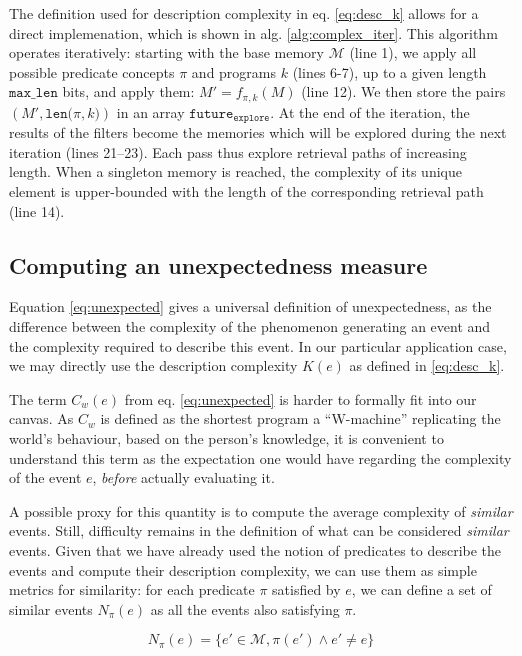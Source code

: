 \documentclass[conference]{IEEEtran}
\begin{document}
The definition used for description complexity in eq. \ref{eq:desc_k} allows for
a direct implemenation, which is shown in alg. \ref{alg:complex_iter}. This
algorithm operates iteratively: starting with the base memory $\mathcal{M}$
(line 1), we apply all possible predicate concepts $\pi$ and programs $k$ (lines
6-7), up to a given length $\mathtt{max\_len}$ bits, and apply them:
$M' = f_{\pi, k}(M)$ (line 12). We then store the pairs
$(M', \mathtt{len(}\pi, k\mathtt{)})$ in an array $\mathtt{future_{explore}}$. At
the end of the iteration, the results of the filters become the memories which
will be explored during the next iteration (lines 21--23). Each pass thus explore
retrieval paths of increasing length. When a singleton memory is reached, the
complexity of its unique element is upper-bounded with the length of the
corresponding retrieval path (line 14).


\subsection{Computing an unexpectedness measure}
Equation \ref{eq:unexpected} gives a universal definition of unexpectedness, as
the difference between the complexity of the phenomenon generating an event and
the complexity required to describe this event. In our particular application
case, we may directly use the description complexity $K(e)$ as defined in
\ref{eq:desc_k}.

The term $C_{w}(e)$ from eq. \ref{eq:unexpected} is harder to formally
fit into our canvas. As $C_{w}$ is defined as the shortest program a
``W-machine'' replicating the world's behaviour, based on the person's
knowledge\cite{dessalles2011coincidences}, it is convenient to understand this
term as the expectation one would have regarding the complexity of the event
$e$, \emph{before} actually evaluating it.

A possible proxy for this quantity is to compute the average complexity
of \emph{similar} events. Still, difficulty remains in the definition of what
can be considered \emph{similar} events. Given that we have already used the
notion of predicates to describe the events and compute their description
complexity, we can use them as simple metrics for similarity: for each predicate
$\pi$ satisfied by $e$, we can define a set of similar events $N_{\pi}(e)$ as
all the events also satisfying $\pi$.

\begin{equation}
\label{eq:similar}
N_{\pi}(e) = \{e'\in \mathcal{M}, \pi(e') \wedge e' \neq e\}
\end{equation}
\end{document}
